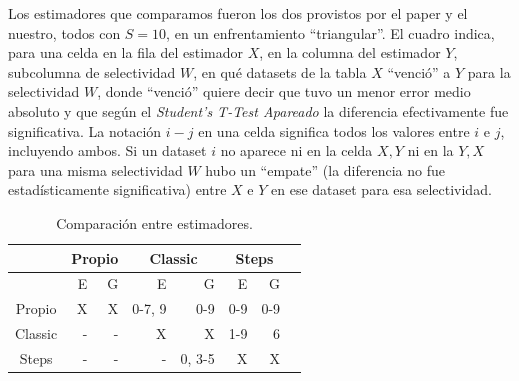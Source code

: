 \clearpage
Los estimadores que comparamos fueron los dos provistos por el paper y el nuestro, todos con $S=10$, en un enfrentamiento ``triangular''.
El cuadro indica, para una celda en la fila del estimador $X$, en la columna del estimador $Y$, subcolumna de selectividad $W$, en qué datasets de la tabla $X$ ``venció'' a $Y$ para la selectividad $W$, donde ``venció'' quiere decir que tuvo un menor error medio absoluto y que según el \textit{Student’s T-Test Apareado} la diferencia efectivamente fue significativa. La notación $i-j$ en una celda significa todos los valores entre $i$ e $j$, incluyendo ambos. Si un dataset $i$ no aparece ni en la celda $X, Y$ ni en la $Y, X$ para una misma selectividad $W$ hubo un ``empate'' (la diferencia no fue estadísticamente significativa) entre $X$ e $Y$ en ese dataset para esa selectividad.

\begin{table}[h!t]
\centering %
\begin{tabular}{c rrrrrrr} %
\hline\hline %
\ &\multicolumn{2}{c}{Propio}& \multicolumn{2}{c}{Classic}& \multicolumn{2}{c}{Steps} \\ [0.5ex] 
\hline %
 & E & G & E & G & E & G &  \\  
\hline
Propio &X  &X  &0-7, 9 &0-9 &0-9 &0-9 \\ %
\hline
Classic &-  &-  &X &X &1-9 &6 \\
\hline
Steps &-  &- &- &0, 3-5 &X &X  \\[1ex] %
\hline %
\end{tabular}
\caption{Comparación entre estimadores.} %
\label{tab:hresult}
\end{table}

